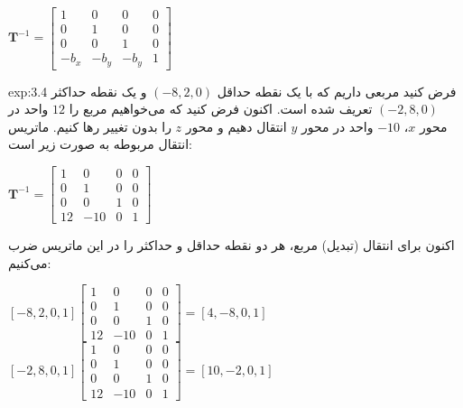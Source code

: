 {\begin{spacing}{1.5}
        \begin{center}
            $\textbf{T}^{-1}=\begin{bmatrix}
                                 1      & 0      & 0      & 0 \\
                                 0      & 1      & 0      & 0 \\
                                 0      & 0      & 1      & 0 \\
                                 -b_{x} & -b_{y} & -b_{y} & 1
            \end{bmatrix}$
        \end{center}

        \begin{example}{exp:3.4}
            \Large
            فرض کنید مربعی داریم که با یک نقطه حداقل $(-8, 2, 0)$ و یک نقطه حداکثر $(-2, 8, 0)$ تعریف شده است.
            اکنون فرض کنید که می‌خواهیم مربع را $12$ واحد در محور $x$، $-10$ واحد در محور $y$ انتقال دهیم
            و محور $z$ را بدون تغییر رها کنیم.
            ماتریس انتقال مربوطه به صورت زیر است:

            \begin{center}
                $\textbf{T}^{-1}=\begin{bmatrix}
                                     1  & 0   & 0 & 0 \\
                                     0  & 1   & 0 & 0 \\
                                     0  & 0   & 1 & 0 \\
                                     12 & -10 & 0 & 1
                \end{bmatrix}$
            \end{center}

            اکنون برای انتقال (تبدیل) مربع، هر دو نقطه حداقل و حداکثر را در این ماتریس ضرب می‌کنیم:

            \begin{center}
                $[-8, 2, 0, 1]\begin{bmatrix}
                                  1  & 0   & 0 & 0 \\
                                  0  & 1   & 0 & 0 \\
                                  0  & 0   & 1 & 0 \\
                                  12 & -10 & 0 & 1
                \end{bmatrix}=[4, -8, 0, 1]$ \\
                $[-2, 8, 0, 1]\begin{bmatrix}
                                  1  & 0   & 0 & 0 \\
                                  0  & 1   & 0 & 0 \\
                                  0  & 0   & 1 & 0 \\
                                  12 & -10 & 0 & 1
                \end{bmatrix}=[10, -2, 0, 1]$
            \end{center}


\end{example}
\end{spacing}}
